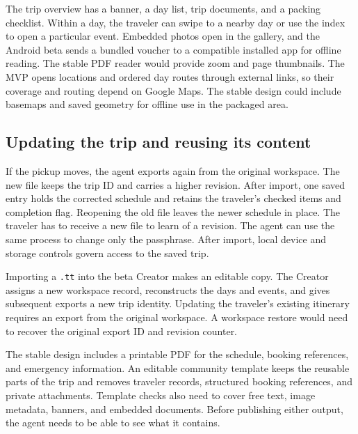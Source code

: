 The trip overview has a banner, a day list, trip documents, and a packing checklist. Within a day, the traveler can swipe to a nearby day or use the index to open a particular event. Embedded photos open in the gallery, and the Android beta sends a bundled voucher to a compatible installed app for offline reading. The stable PDF reader would provide zoom and page thumbnails. The MVP opens locations and ordered day routes through external links, so their coverage and routing depend on Google Maps. The stable design could include basemaps and saved geometry for offline use in the packaged area.

\subsection{Updating the trip and reusing its content}
If the pickup moves, the agent exports again from the original workspace. The new file keeps the trip ID and carries a higher revision. After import, one saved entry holds the corrected schedule and retains the traveler's checked items and completion flag. Reopening the old file leaves the newer schedule in place. The traveler has to receive a new file to learn of a revision. The agent can use the same process to change only the passphrase. After import, local device and storage controls govern access to the saved trip.

Importing a \texttt{.tt} into the beta Creator makes an editable copy. The Creator assigns a new workspace record, reconstructs the days and events, and gives subsequent exports a new trip identity. Updating the traveler's existing itinerary requires an export from the original workspace. A workspace restore would need to recover the original export ID and revision counter.

The stable design includes a printable PDF for the schedule, booking references, and emergency information. An editable community template keeps the reusable parts of the trip and removes traveler records, structured booking references, and private attachments. Template checks also need to cover free text, image metadata, banners, and embedded documents. Before publishing either output, the agent needs to be able to see what it contains.
